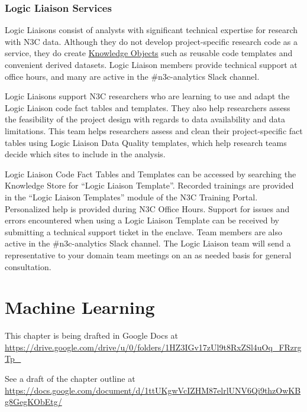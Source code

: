 \documentclass[
  letterpaper,
  DIV=11,
  numbers=noendperiod]{scrreprt}
\begin{document}
\hypertarget{sec-support-liaisons-logic}{%
\subsection{Logic Liaison Services}\label{sec-support-liaisons-logic}}

Logic Liaisons consist of analysts with significant technical expertise
for research with N3C data. Although they do not develop
project-specific research code as a service, they do create
\protect\hyperlink{knowledge-objects}{Knowledge Objects} such as
reusable code templates and convenient derived datasets. Logic Liaison
members provide technical support at office hours, and many are active
in the \#n3c-analytics Slack channel.

Logic Liaisons support N3C researchers who are learning to use and adapt
the Logic Liaison code fact tables and templates. They also help
researchers assess the feasibility of the project design with regards to
data availability and data limitations. This team helps researchers
assess and clean their project-specific fact tables using Logic Liaison
Data Quality templates, which help research teams decide which sites to
include in the analysis.

Logic Liaison Code Fact Tables and Templates can be accessed by
searching the Knowledge Store for ``Logic Liaison Template''. Recorded
trainings are provided in the ``Logic Liaison Templates'' module of the
N3C Training Portal. Personalized help is provided during N3C Office
Hours. Support for issues and errors encountered when using a Logic
Liaison Template can be received by submitting a technical support
ticket in the enclave. Team members are also active in the
\#n3c-analytics Slack channel. The Logic Liaison team will send a
representative to your domain team meetings on an as needed basis for
general consultation.

\hypertarget{sec-machine-learning}{%
\chapter{Machine Learning}\label{sec-machine-learning}}

\begin{tcolorbox}[enhanced jigsaw, rightrule=.15mm, colback=white, leftrule=.75mm, breakable, left=2mm, bottomtitle=1mm, opacityback=0, toprule=.15mm, colframe=quarto-callout-note-color-frame, titlerule=0mm, toptitle=1mm, coltitle=black, title=\textcolor{quarto-callout-note-color}{\faInfo}\hspace{0.5em}{Note}, bottomrule=.15mm, arc=.35mm, opacitybacktitle=0.6, colbacktitle=quarto-callout-note-color!10!white]

This chapter is being drafted in Google Docs at
\url{https://drive.google.com/drive/u/0/folders/1HZ3IGv17zUl9t8RxZSl4uOq_FRzrgTp_}

See a draft of the chapter outline at
\url{https://docs.google.com/document/d/1ttUKgwVcIZHM87elrlUNV6Qi9thzOwKBg8GegKObEtg/}

\end{tcolorbox}
\end{document}
